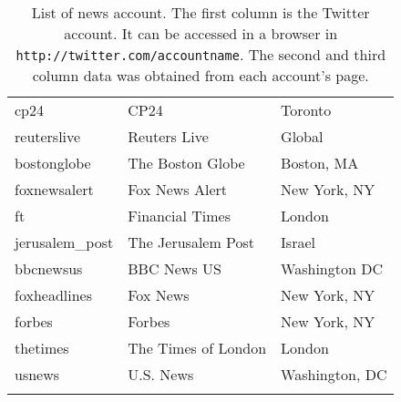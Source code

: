 \begin{longtable}{l|l|l}
 cp24             &  CP24                  &  Toronto                     \\
 reuterslive      &  Reuters Live          &  Global                      \\
 bostonglobe      &  The Boston Globe      &  Boston, MA                  \\
 foxnewsalert     &  Fox News Alert        &  New York, NY                \\
 ft               &  Financial Times       &  London                      \\
 jerusalem\_post   &  The Jerusalem Post    &  Israel                      \\
 bbcnewsus        &  BBC News US           &  Washington DC               \\
 foxheadlines     &  Fox News              &  New York, NY                \\
 forbes           &  Forbes                &  New York, NY                \\
 thetimes         &  The Times of London   &  London                      \\
 usnews           &  U.S. News             &  Washington, DC\\


\caption[List of news accounts.]{List of news account. The first
  column is the Twitter account. It can be accessed in a browser in
  \texttt{http://twitter.com/accountname}. The second and third column
  data was obtained from each account's page.}

\end{longtable}



\clearpage
